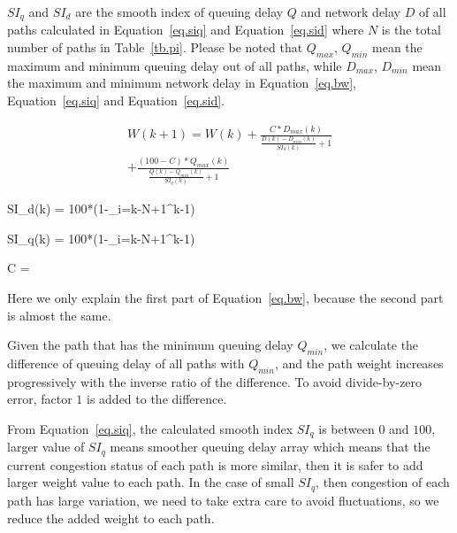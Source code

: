 $SI_q$ and $SI_d$ are the smooth index of queuing delay $Q$ and network delay $D$ of all paths calculated in Equation~\ref{eq.siq}  and Equation~\ref{eq.sid} where $N$ is the total number of paths in Table~\ref{tb.pi}. Please be noted that $Q_{max}$, $Q_{min}$ mean the maximum and minimum queuing delay out of all paths, while $D_{max}$, $D_{min}$ mean the maximum and minimum network delay in Equation~\ref{eq.bw}, Equation~\ref{eq.siq} and Equation~\ref{eq.sid}.
%

\begin{eqnarray}
\label{eq.bw}
W(k+1) = W(k) + \frac{C*D_{max}(k)}{\frac{D(k)-D_{min}(k)}{SI_d(k)}+1} \nonumber \\
\left.		  + \frac{(100-C)*Q_{max}(k)}{\frac{Q(k)-Q_{min}(k)}{SI_q(k)}+1} \right. 
\end{eqnarray}

\be
\label{eq.sid}
SI_d(k) = 100*(1-\sum_{i=k-N+1}^{k-1})
\ee

\be
\label{eq.siq}
SI_q(k) = 100*(1-\sum_{i=k-N+1}^{k-1})
\ee

\be
\label{eq.c}
C = 
\ee

Here we only explain the first part of Equation~\ref{eq.bw}, because the second part is almost the same.

Given the path that has the minimum queuing delay $Q_{min}$, we calculate the difference of queuing delay of all paths with $Q_{min}$, and the path weight increases progressively with the inverse ratio of the difference. To avoid divide-by-zero error, factor $1$ is added to the difference.

From Equation~\ref{eq.siq}, the calculated smooth index $SI_q$ is between $0$ and $100$, larger value of $SI_q$ means smoother queuing delay array which means that the current congestion status of each path is more similar, then it is safer to add larger weight value to each path. In the case of small $SI_q$, then congestion of each path has large variation, we need to take extra care to avoid fluctuations, so we reduce the added weight to each path.

